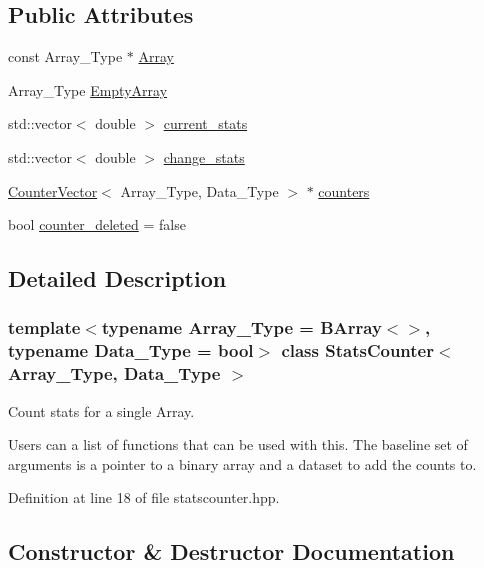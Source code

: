 \subsection*{Public Attributes}
\begin{DoxyCompactItemize}
\item 
const Array\+\_\+\+Type $\ast$ \hyperlink{class_stats_counter_aa826cd748cd3b1a57cbec52424285485}{Array}
\item 
Array\+\_\+\+Type \hyperlink{class_stats_counter_a026304bec607994865ba5bb4e18f9104}{Empty\+Array}
\item 
std\+::vector$<$ double $>$ \hyperlink{class_stats_counter_af98192f893280a2681a59f4b73051ca3}{current\+\_\+stats}
\item 
std\+::vector$<$ double $>$ \hyperlink{class_stats_counter_a42c926799d8cb0abc6f5a1cfbc073f69}{change\+\_\+stats}
\item 
\hyperlink{class_counter_vector}{Counter\+Vector}$<$ Array\+\_\+\+Type, Data\+\_\+\+Type $>$ $\ast$ \hyperlink{class_stats_counter_a3115a96cbc1b35483a240b1fdc84eab6}{counters}
\item 
bool \hyperlink{class_stats_counter_a9306fc44d8b02a953da4237f8950a53a}{counter\+\_\+deleted} = false
\end{DoxyCompactItemize}


\subsection{Detailed Description}
\subsubsection*{template$<$typename Array\+\_\+\+Type = B\+Array$<$$>$, typename Data\+\_\+\+Type = bool$>$\newline
class Stats\+Counter$<$ Array\+\_\+\+Type, Data\+\_\+\+Type $>$}

Count stats for a single Array. 

Users can a list of functions that can be used with this. The baseline set of arguments is a pointer to a binary array and a dataset to add the counts to. 

Definition at line 18 of file statscounter.\+hpp.



\subsection{Constructor \& Destructor Documentation}
\mbox{\label{class_stats_counter_aad1531e93d2d217c5cfd6b389ccf6fba}} 
